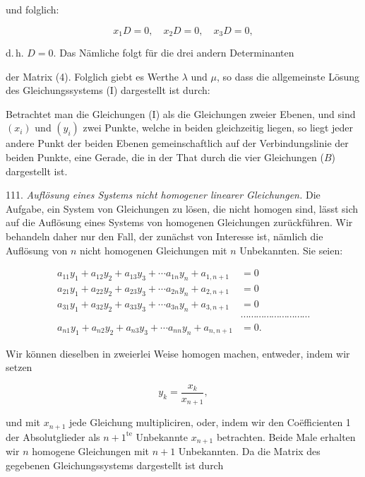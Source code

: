 und folglich:

\[ x_1D=0,\quad x_2D=0,\quad x_3D=0, \]

d.\,h. $D=0$. Das Nämliche folgt für die drei andern Determinanten



der Matrix (4). Folglich giebt es Werthe $\lambda$ und $\mu$, so dass die allgemeinste Lösung des Gleichungssystems (I) dargestellt ist durch:


Betrachtet man die Gleichungen (I) als die Gleichungen zweier Ebenen, und sind $(x_i)$ und $(y_i)$ zwei Punkte, welche in beiden gleichzeitig liegen, so liegt jeder andere Punkt der beiden Ebenen gemeinschaftlich auf der Verbindungslinie der beiden Punkte, eine Gerade, die in der That durch die vier Gleichungen ($B$) dargestellt ist.

111. \textit{Auflösung eines Systems nicht homogener linearer Gleichungen.} Die Aufgabe, ein System von Gleichungen zu lösen, die nicht homogen sind, lässt sich auf die Auflösung eines Systems von homogenen Gleichungen zurückführen. Wir behandeln daher nur den Fall, der zunächst von Interesse ist, nämlich die Auflösung von $n$ nicht homogenen Gleichungen mit $n$ Unbekannten. Sie seien:

\[ \begin{aligned}
a_{11}y_1+a_{12}y_2+a_{13}y_3+\cdots a_{1n}y_n+a_{1,n+1}&=0\\
a_{21}y_1+a_{22}y_2+a_{23}y_3+\cdots a_{2n}y_n+a_{2,n+1}&=0\\
a_{31}y_1+a_{32}y_2+a_{33}y_3+\cdots a_{3n}y_n+a_{3,n+1}&=0\\
&\cdots\cdots\cdots\cdots\cdots\cdots\cdots\cdots\cdots\\
a_{n1}y_1+a_{n2}y_2+a_{n3}y_3+\cdots a_{nn}y_n+a_{n,n+1}&=0.
\end{aligned} \]

Wir können dieselben in zweierlei Weise homogen machen, entweder, indem wir setzen

\[ y_k = \frac{x_k}{x_{n+1}}, \]

und mit $x_{n+1}$ jede Gleichung multipliciren, oder, indem wir den Co\"efficienten 1 der Absolutglieder als $n+1^{\text{te}}$ Unbekannte $x_{n+1}$ betrachten. Beide Male erhalten wir $n$ homogene Gleichungen mit $n+1$ Unbekannten. Da die Matrix des gegebenen Gleichungssystems dargestellt ist durch

